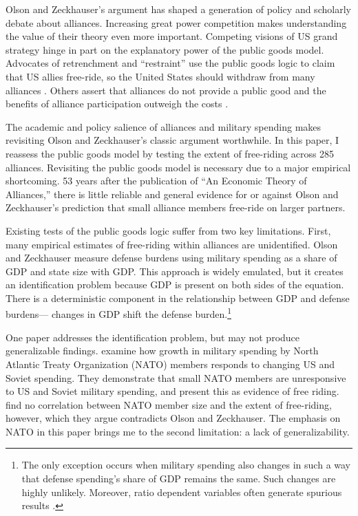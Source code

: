 \documentclass[12pt]{article}
\begin{document}
Olson and Zeckhauser's argument has shaped a generation of policy and scholarly debate about alliances. 
Increasing great power competition makes understanding the value of their theory even more important. 
Competing visions of US grand strategy hinge in part on the explanatory power of the public goods model. 
Advocates of retrenchment and ``restraint'' use the public goods logic to claim that US allies free-ride, so the United States should withdraw from many alliances \citep{Preble2009, Posen2014}. 
Others assert that alliances do not provide a public good and the benefits of alliance participation outweigh the costs \citep{Brooksetal2013, BrandsFeaver2017}. 


The academic and policy salience of alliances and military spending makes revisiting Olson and Zeckhauser's classic argument worthwhile. 
In this paper, I reassess the public goods model by testing the extent of free-riding across 285 alliances. 
Revisiting the public goods model is necessary due to a major empirical shortcoming.
53 years after the publication of ``An Economic Theory of Alliances,'' there is little reliable and general evidence for or against Olson and Zeckhauser's prediction that small alliance members free-ride on larger partners. 


Existing tests of the public goods logic suffer from two key limitations.
First, many empirical estimates of free-riding within alliances are unidentified.
Olson and Zeckhauser measure defense burdens using military spending as a share of GDP and state size with GDP.
This approach is widely emulated, but it creates an identification problem because GDP is present on both sides of the equation.
There is a deterministic component in the relationship between GDP and defense burdens--- changes in GDP shift the defense burden.\footnote{
The only exception occurs when military spending also changes in such a way that defense spending's share of GDP remains the same. Such changes are highly unlikely. Moreover, ratio dependent variables often generate spurious results \citep{Kronmal1993}.}  
 

One paper addresses the identification problem, but may not produce generalizable findings. 
\citet{PluemperNeumayer2015} examine how growth in military spending by North Atlantic Treaty Organization (NATO) members responds to changing US and Soviet spending.
They demonstrate that small NATO members are unresponsive to US and Soviet military spending, and present this as evidence of free riding.
\citet{PluemperNeumayer2015} find no correlation between NATO member size and the extent of free-riding, however, which they argue contradicts Olson and Zeckhauser.
The emphasis on NATO in this paper brings me to the second limitation: a lack of generalizability. 
\end{document}
